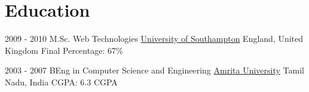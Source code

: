 \documentclass[a4paper]{twentysecondcv} %
\begin{document}
\section{Education}

\begin{twenty} %
  \twentyitem
      {2009 - 2010} %
      {M.Sc. Web Technologies} %
      {\href{https://www.southampton.ac.uk/}{University of Southampton}}
      {England, United Kingdom}
      {Final Percentage: 67\%}
     
  \twentyitem
    {2003 - 2007} %
    {BEng in Computer Science and Engineering} %
    {\href{https://www.amrita.edu/campus/coimbatore/}{Amrita University}}
    {Tamil Nadu, India} %
    {CGPA: 6.3 CGPA}
\end{twenty}
\end{document}

